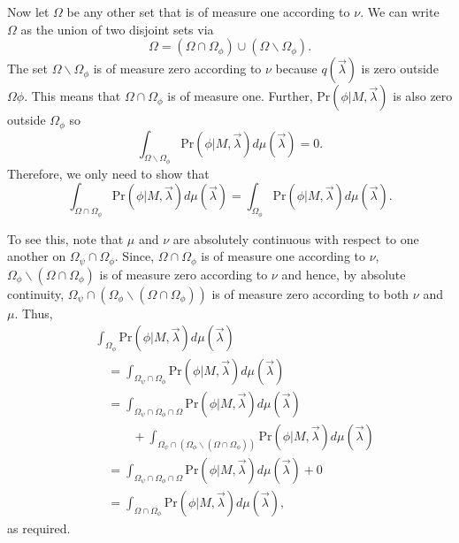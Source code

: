 \documentclass[DIV=calc,paper=a4,fontsize=11pt,twocolumn]{scrartcl} %
\theoremstyle{definition}
\theoremstyle{plain}
\begin{document}
Now let $\Omega$ be any other set that is of measure one according to
$\nu$.  We can write $\Omega$ as the union of two disjoint sets via
\begin{equation}
\Omega = \left (\Omega \cap \Omega_{\phi} \right) \cup \left ( \Omega
\backslash \Omega_{\phi} \right ).
\end{equation}
The set $\Omega \backslash \Omega_{\phi}$ is of measure zero according
to $\nu$ because $q(\vec{\lambda})$ is zero outside $\Omega{\phi}$.
This means that $\Omega \cap \Omega_{\phi}$ is of measure one.
Further, $\text{Pr}(\phi|M,\vec{\lambda})$ is also zero outside
$\Omega_{\phi}$ so
\begin{equation}
\int_{\Omega \backslash \Omega_{\phi}} \text{Pr}(\phi|M,\vec{\lambda})
d\mu(\vec{\lambda}) = 0.
\end{equation}
Therefore, we only need to show that
\begin{equation}
\int_{\Omega \cap \Omega_{\phi}} \text{Pr}(\phi|M,\vec{\lambda})
d\mu(\vec{\lambda}) =   \int_{\Omega_{\phi}} \text{Pr}(\phi|M,\vec{\lambda})
d\mu(\vec{\lambda}).
\end{equation}

To see this, note that $\mu$ and $\nu$ are absolutely continuous with
respect to one another on $\Omega_{\psi} \cap \Omega_{\phi}$.  Since,
$\Omega \cap \Omega_{\phi}$ is of measure one according to $\nu$,
$\Omega_{\phi} \backslash \left ( \Omega \cap \Omega_{\phi} \right )$
is of measure zero according to $\nu$ and hence, by absolute
continuity, $\Omega_{\psi} \cap \left ( \Omega_{\phi} \backslash \left
( \Omega \cap \Omega_{\phi} \right ) \right )$ is of measure zero
according to both $\nu$ and $\mu$.  Thus,
\begin{align}
& \int_{\Omega_{\phi}} \text{Pr}(\phi|M,\vec{\lambda}) d\mu(\vec{\lambda})\nonumber\\
&\quad = \int_{\Omega_{\psi} \cap \Omega_{\phi}}\text{Pr}(\phi|M,\vec{\lambda})
d\mu(\vec{\lambda}) \\
&\quad = \int_{\Omega_{\psi} \cap \Omega_{\phi} \cap \Omega}
\text{Pr}(\phi|M,\vec{\lambda}) d\mu(\vec{\lambda}) \nonumber\\
&\quad\quad\quad + \int_{\Omega _{\psi} \cap
\left (\Omega_{\phi} \backslash \left (\Omega \cap
\Omega_{\phi} \right ) \right )} \text{Pr}(\phi|M,\vec{\lambda})
d\mu(\vec{\lambda}) \\
&\quad = \int_{\Omega_{\psi} \cap \Omega_{\phi} \cap \Omega}
\text{Pr}(\phi|M,\vec{\lambda}) d\mu(\vec{\lambda}) + 0 \\
&\quad = \int_{\Omega \cap \Omega_{\phi}} \text{Pr}(\phi|M,\vec{\lambda})
d\mu(\vec{\lambda}),
\end{align}
as required.
\end{document}
